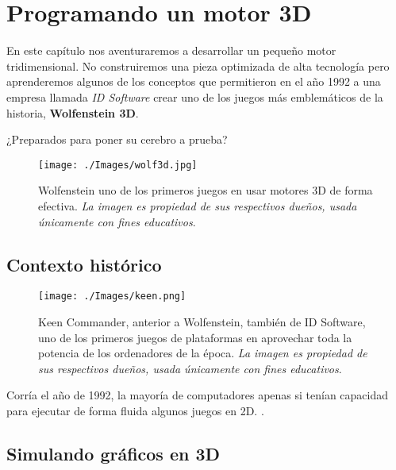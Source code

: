 \chapter{Programando un motor 3D}

En este capítulo nos aventuraremos a desarrollar un pequeño motor tridimensional. No construiremos una pieza optimizada de alta tecnología pero aprenderemos algunos de los conceptos que permitieron en el año 1992 a una empresa llamada \emph{ID Software} crear uno de los juegos más emblemáticos de la historia, \textbf{Wolfenstein 3D}.

¿Preparados para poner su cerebro a prueba?

\begin{figure}[h!]
	\centering
	\texttt{[image: ./Images/wolf3d.jpg]}
	\caption{Wolfenstein uno de los primeros juegos en usar motores 3D de forma efectiva. \emph{La imagen es propiedad de sus respectivos dueños, usada únicamente con fines educativos}.}
	\label{wolf3d}
\end{figure}

\section{Contexto histórico}

\begin{figure}[h!]
	\centering
	\texttt{[image: ./Images/keen.png]}
	\caption{Keen Commander, anterior a Wolfenstein, también de ID Software, uno de los primeros juegos de plataformas en aprovechar toda la potencia de los ordenadores de la época. \emph{La imagen es propiedad de sus respectivos dueños, usada únicamente con fines educativos}.}
	\label{keen}
\end{figure}

Corría el año de 1992, la mayoría de computadores apenas si tenían capacidad para ejecutar de forma fluida algunos juegos en 2D. \emph{}.


\newpage

\section{Simulando gráficos en 3D}


